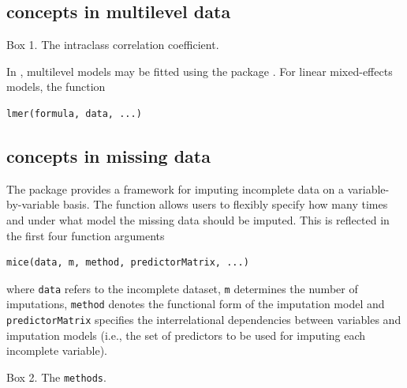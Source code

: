 \documentclass[
  article]{jss}
\newcommand{\fct}[1]{\code{#1()}}
\begin{document}
\hypertarget{concepts-in-multilevel-data}{%
\subsection{concepts in multilevel
data}\label{concepts-in-multilevel-data}}

\begin{tcolorbox}[enhanced jigsaw, left=2mm, leftrule=.75mm, bottomrule=.15mm, toprule=.15mm, breakable, colback=white, opacityback=0, arc=.35mm, rightrule=.15mm]

Box 1. The intraclass correlation coefficient.

\end{tcolorbox}

In , multilevel models may be fitted using the package
. For linear mixed-effects models, the function

\begin{verbatim}
lmer(formula, data, ...)
\end{verbatim}

\hypertarget{concepts-in-missing-data}{%
\subsection{concepts in missing data}\label{concepts-in-missing-data}}

The  package  provides a framework for imputing
incomplete data on a variable-by-variable basis. The \fct{mice} function
allows users to flexibly specify how many times and under what model the
missing data should be imputed. This is reflected in the first four
function arguments

\begin{verbatim}
mice(data, m, method, predictorMatrix, ...)
\end{verbatim}

where \texttt{data} refers to the incomplete dataset, \texttt{m}
determines the number of imputations, \texttt{method} denotes the
functional form of the imputation model and \texttt{predictorMatrix}
specifies the interrelational dependencies between variables and
imputation models (i.e., the set of predictors to be used for imputing
each incomplete variable).

\begin{tcolorbox}[enhanced jigsaw, left=2mm, leftrule=.75mm, bottomrule=.15mm, toprule=.15mm, breakable, colback=white, opacityback=0, arc=.35mm, rightrule=.15mm]

Box 2. The \texttt{methods}.

\end{tcolorbox}
\end{document}
